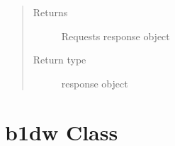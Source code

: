 \documentclass[letterpaper,10pt,english]{sphinxmanual}
\begin{document}
\begin{fulllineitems}
\begin{fulllineitems}
\begin{quote}
\begin{description}
\item[{Returns}] \leavevmode
\sphinxAtStartPar
Requests response object

\item[{Return type}] \leavevmode
\sphinxAtStartPar
response object

\end{description}\end{quote}

\end{fulllineitems}


\end{fulllineitems}



\section{b1dw Class}
\label{\detokenize{b1sw-class:b1dw-class}}\label{\detokenize{b1sw-class::doc}}
\end{document}
